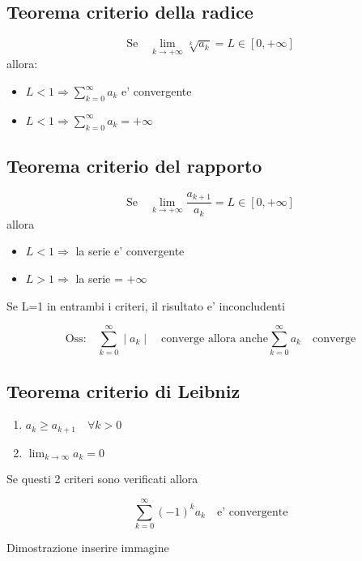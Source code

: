 \documentclass{article}
\begin{document}
          \subsection{Teorema criterio della radice}
          \begin{equation*}
            \text{Se} \quad \lim_{k\to +\infty} \sqrt[k]{a_k}=L \in [0,+\infty]
          \end{equation*}
          allora:
          \begin{itemize}
            \item $L<1 \Rightarrow \sum^{\infty}_{k=0} a_k$ e' convergente 
            \item $L<1 \Rightarrow \sum^{\infty}_{k=0} a_k=+\infty$
          \end{itemize}
          \subsection{Teorema criterio del rapporto}
          \begin{equation*}
            \text{Se} \quad \lim_{k\to +\infty} \frac{a_{k+1}}{a_k}=L \in [0,+\infty]
          \end{equation*}
          allora
          \begin{itemize}
            \item $L<1 \Rightarrow$ la serie e' convergente 
            \item $L>1 \Rightarrow$ la serie  = $+\infty$
          \end{itemize}
          \begin{flushleft}
            Se L=1 in entrambi i criteri, il risultato e' inconcludenti
          \end{flushleft}
          \begin{equation*} 
            \text{Oss:} \quad \sum^{\infty}_{k=0} \mid a_k \mid \quad \text{converge allora anche} \sum^{\infty}_{k=0} a_k \quad \text{converge}
          \end{equation*}
          \subsection{Teorema criterio di Leibniz}
          \begin{enumerate}
            \item $a_k \geq a_{k+1} \quad \forall k>0$
            \item $\lim_{k\to \infty} a_k=0$
          \end{enumerate}
          \begin{flushleft}
           Se questi 2 criteri sono verificati allora 
          \end{flushleft}
          \begin{equation*}
            \sum^{\infty}_{k=0} (-1)^ka_k \quad \text{e' convergente}
          \end{equation*}
          \begin{flushleft}
            Dimostrazione inserire immagine
          \end{flushleft}
\end{document}
